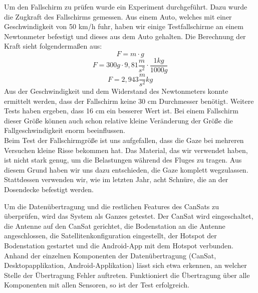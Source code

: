 Um den Fallschirm zu prüfen wurde ein Experiment durchgeführt. Dazu wurde die Zugkraft des Fallschirms gemessen. Aus einem Auto, welches mit einer Geschwindigkeit von 50 km/h fuhr, haben wir einige Testfallschirme an einem Newtonmeter befestigt und dieses aus dem Auto gehalten. Die Berechnung der Kraft sieht folgendermaßen aus:
\[
F = m \cdot g
\]
\[
F = 300g \cdot 9,81\frac{m}{s^2} \cdot \frac{1kg}{1000g}
\]
\[
F = 2,943 \frac{m}{s^2} kg
\]
Aus der Geschwindigkeit und dem Widerstand des Newtonmeters konnte ermittelt werden, dass der Fallschirm keine 30 cm Durchmesser benötigt. Weitere Tests haben ergeben, dass 16 cm ein besserer Wert ist. Bei einem Fallschirm dieser Größe können auch schon relative kleine Veränderung der Größe die Fallgeschwindigkeit enorm beeinflussen. \\
Beim Test der Fallschirmgröße ist uns aufgefallen, dass die Gaze bei mehreren Versuchen kleine Risse bekommen hat. Das Material, das wir verwendet haben, ist nicht stark genug, um die Belastungen während des Fluges zu tragen. Aus diesem Grund haben wir uns dazu entschieden, die Gaze komplett wegzulassen. Stattdessen verwenden wir, wie im letzten Jahr, acht Schnüre, die an der Dosendecke befestigt werden.

Um die Datenübertragung und die restlichen Features des CanSats zu überprüfen, wird das System als Ganzes getestet. Der CanSat wird eingeschaltet, die Antenne auf den CanSat gerichtet, die Bodenstation an die Antenne angeschlossen, die Satellitenkonfiguration eingestellt, der Hotspot der Bodenstation gestartet und die Android-App mit dem Hotspot verbunden. Anhand der einzelnen Komponenten der Datenübertragung (CanSat, Desktopapplikation, Android-Applikation) lässt sich etwa erkennen, an welcher Stelle der Übertragung Fehler auftreten. Funktioniert die Übertragung über alle Komponenten mit allen Sensoren, so ist der Test erfolgreich.